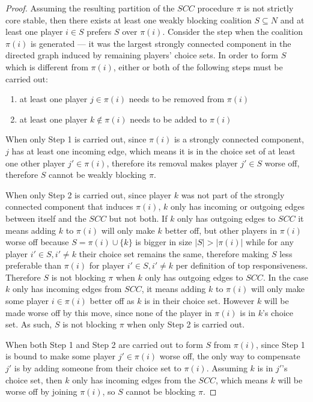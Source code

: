 \documentclass[letterpaper]{article} %
\newcommand{\SCC}{\mathit{SCC}}
\theoremstyle{definition}
\begin{document}
\begin{proof}
Assuming the resulting partition of the $SCC$ procedure $\pi$ is not strictly core stable, then there exists at least one weakly blocking coalition $S \subseteq N$ and at least one player $i \in S$ prefers $S$ over $\pi(i)$. Consider the step when the coalition $\pi(i)$ is generated --- it was the largest strongly connected component in the directed graph induced by remaining players' choice sets. In order to form $S$ which is different from $\pi(i)$, either or both of the following steps must be carried out:

\begin{enumerate}
  \item at least one player $j \in \pi(i)$ needs to be removed from $\pi(i)$
  \item at least one player $k \notin \pi(i)$ needs to be added to $\pi(i)$
\end{enumerate}

When only Step 1 is carried out, since $\pi(i)$ is a strongly connected component, $j$ has at least one incoming edge, which means it is in the choice set of at least one other player $j' \in \pi(i)$, therefore its removal makes player $j' \in S$ worse off, therefore $S$ cannot be weakly blocking $\pi$.

When only Step 2 is carried out, since player $k$ was not part of the strongly connected component that induces $\pi(i)$, $k$ only has incoming or outgoing edges between itself and the $\SCC$ but not both. If $k$ only has outgoing edges to $\SCC$ it means adding $k$ to $\pi(i)$ will only make $k$ better off, but other players in $\pi(i)$ worse off because $S = \pi(i) \cup \{k\}$ is bigger in size $|S| > |\pi(i)|$ while for any player $i' \in S, i' \neq k$ their choice set remains the same, therefore making $S$ less preferable than $\pi(i)$ for player $i' \in S, i' \neq k$ per definition of top responsiveness. Therefore $S$ is not blocking $\pi$ when $k$ only has outgoing edges to $\SCC$. In the case $k$ only has incoming edges from $\SCC$, it means adding $k$ to $\pi(i)$ will only make some player $i \in \pi(i)$ better off as $k$ is in their choice set. 
However $k$ will be made worse off by this move, since none of the player in $\pi(i)$ is in $k$'s choice set. As such, $S$ is not blocking $\pi$ when only Step 2 is carried out.

When both Step 1 and Step 2 are carried out to form $S$ from $\pi(i)$, since Step 1 is bound to make some player $j' \in \pi(i)$ worse off, the only way to compensate $j'$ is by adding someone from their choice set to $\pi(i)$. Assuming $k$ is in $j'$'s choice set, then $k$ only has incoming edges from the $\SCC$, which means $k$ will be worse off by joining $\pi(i)$, so $S$ cannot be blocking $\pi$.
\end{proof}
\end{document}
